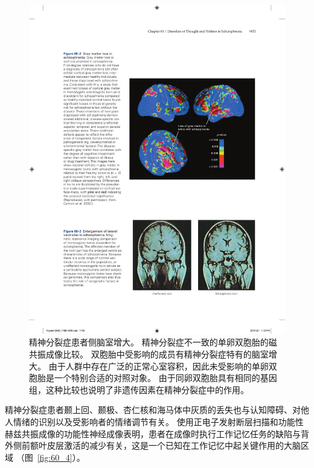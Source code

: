 \begin{figure}[htbp]
	\centering
	\includegraphics[width=0.7\linewidth]{chap60/fig_60_3}
	\caption{精神分裂症患者侧脑室增大。
		精神分裂症不一致的单卵双胞胎的磁共振成像比较。
		双胞胎中受影响的成员有精神分裂症特有的脑室增大。
		由于人群中存在广泛的正常心室容积，因此未受影响的单卵双胞胎是一个特别合适的对照对象。
		由于同卵双胞胎具有相同的基因组，这种比较也说明了非遗传因素在精神分裂症中的作用。}
	\label{fig:60_3}
\end{figure}


精神分裂症患者颞上回、颞极、杏仁核和海马体中灰质的丢失也与认知障碍、对他人情绪的识别以及受影响者的情绪调节有关。
使用正电子发射断层扫描和功能性赫兹共振成像的功能性神经成像表明，患者在成像时执行工作记忆任务的缺陷与背外侧前额叶皮层激活的减少有关，这是一个已知在工作记忆中起关键作用的大脑区域 （图~\ref{fig:60_4}）。


